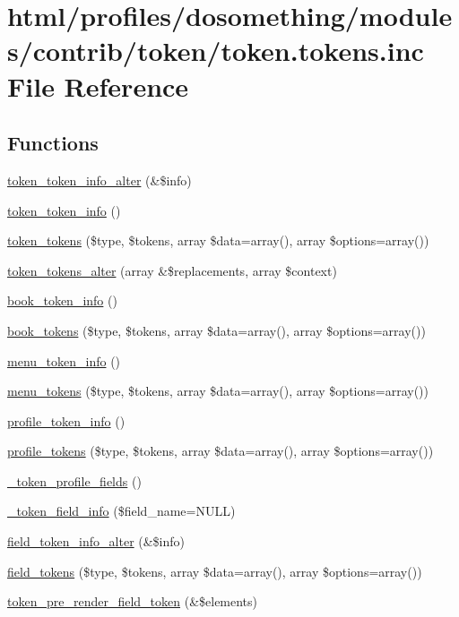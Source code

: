 \hypertarget{token_8tokens_8inc}{
\section{html/profiles/dosomething/modules/contrib/token/token.tokens.inc File Reference}
\label{token_8tokens_8inc}
}
\subsection*{Functions}
\begin{DoxyCompactItemize}
\item 
\hyperlink{token_8tokens_8inc_ad634dc57d9d19bb21135a670ef40e95f}{token\_\-token\_\-info\_\-alter} (\&\$info)
\item 
\hyperlink{token_8tokens_8inc_a4f24fde1a5b2d27bae2edf4e415ebb67}{token\_\-token\_\-info} ()
\item 
\hyperlink{token_8tokens_8inc_a2de5011f4dbf53434a231c973af2b73d}{token\_\-tokens} (\$type, \$tokens, array \$data=array(), array \$options=array())
\item 
\hyperlink{token_8tokens_8inc_ac238d7743df5e0b29418569a4aa88ab9}{token\_\-tokens\_\-alter} (array \&\$replacements, array \$context)
\item 
\hyperlink{token_8tokens_8inc_a6499d39402db3d80a41c5791d4deff90}{book\_\-token\_\-info} ()
\item 
\hyperlink{token_8tokens_8inc_a107b610501b0cf966d8b2df90becf740}{book\_\-tokens} (\$type, \$tokens, array \$data=array(), array \$options=array())
\item 
\hyperlink{token_8tokens_8inc_a285b335dc2753c36919b35c473a08cdd}{menu\_\-token\_\-info} ()
\item 
\hyperlink{token_8tokens_8inc_a34b9f49bd301ee8ffcba2620ec02b154}{menu\_\-tokens} (\$type, \$tokens, array \$data=array(), array \$options=array())
\item 
\hyperlink{token_8tokens_8inc_ab97ba048343fb5e851742c14a5094dff}{profile\_\-token\_\-info} ()
\item 
\hyperlink{token_8tokens_8inc_a4518396f5dcfa6d62520bcde83355887}{profile\_\-tokens} (\$type, \$tokens, array \$data=array(), array \$options=array())
\item 
\hyperlink{token_8tokens_8inc_ad36240eb20997d7ac4a269acdbab5bc0}{\_\-token\_\-profile\_\-fields} ()
\item 
\hyperlink{token_8tokens_8inc_a863ababdc18d92450465ee4a3ebc9f62}{\_\-token\_\-field\_\-info} (\$field\_\-name=NULL)
\item 
\hyperlink{token_8tokens_8inc_ac1ef025e605f22d4beca380e26783ec8}{field\_\-token\_\-info\_\-alter} (\&\$info)
\item 
\hyperlink{token_8tokens_8inc_a2db53cfa66a34afc752a40a00c03d9ca}{field\_\-tokens} (\$type, \$tokens, array \$data=array(), array \$options=array())
\item 
\hyperlink{token_8tokens_8inc_af364a1d0d72ea86fb76670a270ceb7fe}{token\_\-pre\_\-render\_\-field\_\-token} (\&\$elements)
\end{DoxyCompactItemize}


